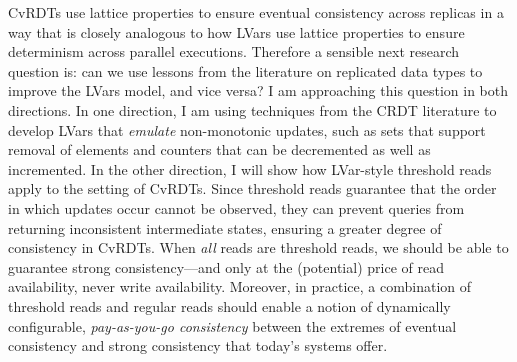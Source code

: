 \documentclass{article}
\begin{document}
CvRDTs use lattice properties to ensure eventual consistency across
replicas in a way that is closely analogous to how LVars use lattice
properties to ensure determinism across parallel executions.
Therefore a sensible next research question is: can we use lessons
from the literature on replicated data types to improve the LVars
model, and vice versa?  I am approaching this question in both
directions.  In one direction, I am using techniques from the CRDT
literature to develop LVars that \emph{emulate} non-monotonic updates,
such as sets that support removal of elements and counters that can be
decremented as well as incremented.  In the other direction, I will
show how LVar-style threshold reads apply to the setting of CvRDTs.
Since threshold reads guarantee that the order in which updates occur
cannot be observed, they can prevent queries from returning
inconsistent intermediate states, ensuring a greater degree of
consistency in CvRDTs.  When \emph{all} reads are threshold reads, we
should be able to guarantee strong consistency---and only at the
(potential) price of read availability, never write
availability. Moreover, in practice, a combination of threshold reads
and regular reads should enable a notion of dynamically configurable,
\emph{pay-as-you-go consistency} between the extremes of eventual
consistency and strong consistency that today's systems offer.


\newcommand{\myname}[0]{\textbf{Lindsey Kuper}}

\end{document}
